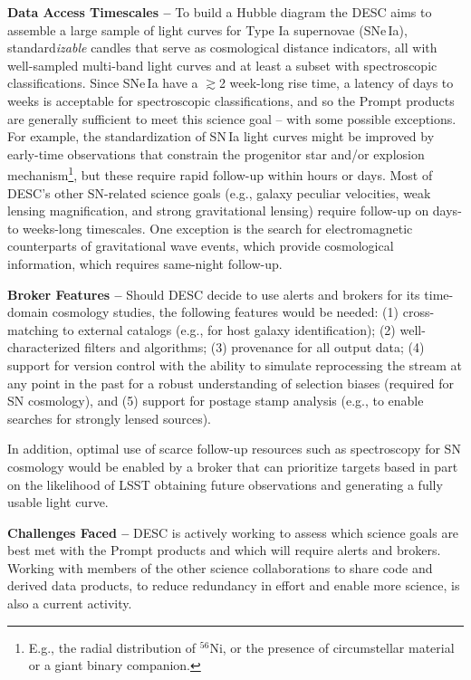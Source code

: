 {\bf Data Access Timescales --}
To build a Hubble diagram the  {DESC} aims to assemble a large sample of light curves for Type Ia supernovae (SNe\,Ia), standard{\it izable} candles that serve as cosmological distance indicators, all with well-sampled multi-band light curves and at least a subset with spectroscopic classifications.
Since SNe\,Ia have a $\gtrsim$2 week-long rise time, a latency of days to weeks is acceptable for spectroscopic classifications, and so the Prompt products are generally sufficient to meet this science goal -- with some possible exceptions.
For example, the standardization of  {SN}\,Ia light curves might be improved by early-time observations that constrain the progenitor star and/or explosion mechanism\footnote{E.g., the radial distribution of $^{56}$Ni, or the presence of circumstellar material or a giant binary companion.}, but these require rapid follow-up within hours or days.
Most of  {DESC}'s other  {SN}-related science goals (e.g., galaxy peculiar velocities, weak lensing magnification, and strong gravitational lensing) require follow-up on days- to weeks-long timescales. 
One exception is the search for electromagnetic counterparts of gravitational wave events, which provide cosmological information, which requires same-night follow-up.

{\bf  {Broker} Features --}
Should  {DESC} decide to use alerts and brokers for its time-domain cosmology studies, the following features would be needed:
(1) cross-matching to external catalogs (e.g., for host galaxy identification);
(2) well-characterized filters and algorithms;
(3)  {provenance} for all output data;
(4) support for version control with the ability to simulate reprocessing the stream at any point in the past for a robust understanding of selection biases (required for  {SN} cosmology), and
(5) support for  {postage stamp} analysis (e.g., to enable searches for strongly lensed sources).

In addition, optimal use of scarce follow-up resources such as spectroscopy for  {SN} cosmology would be enabled by a broker that can prioritize targets based in part on the likelihood of  {LSST} obtaining future observations and generating a fully usable light curve.

{\bf Challenges Faced --}
DESC is actively working to assess which science goals are best met with the Prompt products and which will require alerts and brokers.
Working with members of the other science collaborations to share code and derived data products, to reduce redundancy in effort and enable more science, is also a current activity. 

